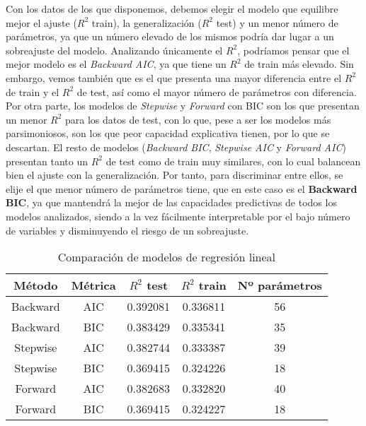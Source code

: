 \documentclass[a4paper,onecolumn]{extarticle}
\begin{document}
\begin{sloppypar}
Con los datos de los que disponemos, debemos elegir el modelo que equilibre mejor el ajuste ($R^2$ train), la generalización ($R^2$ test) y un menor número de 
parámetros, ya que un número elevado de los mismos podría dar lugar a un sobreajuste del modelo. Analizando únicamente el $R^2$, podríamos pensar que el mejor
modelo es el \textit{Backward AIC}, ya que tiene un $R^2$ de train más elevado. Sin embargo, vemos también que es el que presenta una mayor diferencia entre el $R^2$ 
de train y el $R^2$ de test, así como el mayor número de parámetros con diferencia. Por otra parte, los modelos de \textit{Stepwise} y \textit{Forward} con BIC 
son los que presentan un menor $R^2$ para los datos de test, con lo que, pese a ser los modelos más parsimoniosos, son los que peor capacidad explicativa 
tienen, por lo que se descartan. El resto de modelos (\textit{Backward BIC}, \textit{Stepwise AIC} y \textit{Forward AIC}) presentan tanto un $R^2$ de test 
como de train muy similares, con lo cual balancean bien el ajuste con la generalización. Por tanto, para discriminar entre ellos, se elije el que menor número 
de parámetros tiene, que en este caso es el \textbf{Backward BIC}, ya que mantendrá la mejor de las capacidades predictivas de todos los modelos analizados,
siendo a la vez fácilmente interpretable por el bajo número de variables y disminuyendo el riesgo de un sobreajuste.

\begin{table}[]
    \begin{center}
        \begin{tabular}{ |c|c|c|c|c| } 
        \hline
        \textbf{Método} & \textbf{Métrica} & \textbf{$R^{2}$ test} & \textbf{$R^{2}$ train} & \textbf{Nº parámetros} \\
        \hline 
        Backward & AIC & 0.392081 & 0.336811 & 56 \\ 
        Backward & BIC & 0.383429 & 0.335341 & 35 \\ 
        Stepwise & AIC & 0.382744 & 0.333387 & 39 \\ 
        Stepwise & BIC & 0.369415 & 0.324226 & 18 \\ 
        Forward & AIC & 0.382683 & 0.332820 & 40 \\ 
        Forward & BIC & 0.369415 & 0.324227 & 18 \\ 
        \hline
        \end{tabular}
        \caption{Comparación de modelos de regresión lineal}
        \label{table:tablalineal}
    \end{center}
\end{table}


\end{sloppypar}
\end{document}
